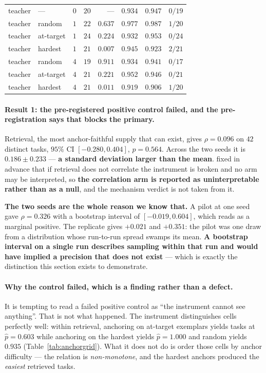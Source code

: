 \begin{table}[t]
\begin{tabular}{llrrrrrr}
teacher   & ---        & $0$ & $20$ & ---     & $0.934$ & $0.947$ & $0/19$ \\
teacher   & random     & $1$ & $22$ & $0.637$ & $0.977$ & $0.987$ & $1/20$ \\
teacher   & at-target  & $1$ & $24$ & $0.224$ & $0.932$ & $0.953$ & $0/24$ \\
teacher   & hardest    & $1$ & $21$ & $0.007$ & $0.945$ & $0.923$ & $2/21$ \\
teacher   & random     & $4$ & $19$ & $0.911$ & $0.934$ & $0.941$ & $0/17$ \\
teacher   & at-target  & $4$ & $21$ & $0.221$ & $0.952$ & $0.946$ & $0/21$ \\
teacher   & hardest    & $4$ & $21$ & $0.011$ & $0.919$ & $0.906$ & $1/20$ \\
\bottomrule
\end{tabular}
\end{table}

\paragraph{Result 1: the pre-registered positive control failed, and the pre-registration says
that blocks the primary.} Retrieval, the most anchor-faithful supply that can exist, gives
$\rho = 0.096$ on $42$ distinct tasks, $95\%$ CI $[-0.280, 0.404]$, $p = 0.564$. Across the two
seeds it is $\mathbf{0.186 \pm 0.233}$ --- \textbf{a standard deviation larger than the mean}.
 fixed in advance that if retrieval does not correlate the
instrument is broken and no arm may be interpreted, so \textbf{the correlation arm is reported
as uninterpretable rather than as a null}, and the mechanism verdict is not taken from it.

\textbf{The two seeds are the whole reason we know that.} A pilot at one seed gave
$\rho = 0.326$ with a bootstrap interval of $[-0.019, 0.604]$, which reads as a marginal
positive. The replicate gives $+0.021$ and $+0.351$: the pilot was one draw from a distribution
whose run-to-run spread swamps its mean. \textbf{A bootstrap interval on a single run describes
sampling within that run and would have implied a precision that does not exist} --- which is
exactly the distinction this section exists to demonstrate.

\paragraph{Why the control failed, which is a finding rather than a defect.} It is tempting to
read a failed positive control as ``the instrument cannot see anything''. That is not what
happened. The instrument distinguishes cells perfectly well: within retrieval, anchoring on
at-target exemplars yields tasks at $\hat p = 0.603$ while anchoring on the hardest yields
$\hat p = 1.000$ and random yields $0.935$ (Table~\ref{tab:anchorgrid}). What it does not do is
order those cells by anchor difficulty --- the relation is \emph{non-monotone}, and the hardest
anchors produced the \emph{easiest} retrieved tasks.

